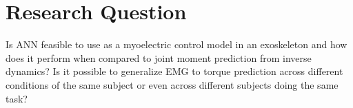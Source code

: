\documentclass[../main.tex]{subfiles}
\begin{document}







\section{Research Question}
Is \ac{ANN} feasible to use as a myoelectric control model in an exoskeleton and how does it perform when compared to joint moment prediction from inverse dynamics?
Is it possible to generalize \ac{EMG} to torque prediction across different conditions of the same subject or even across different subjects doing the same task?
\end{document}

